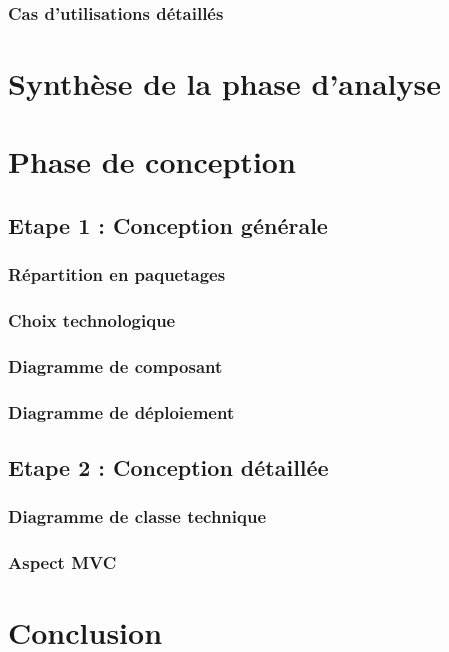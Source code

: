 \documentclass[a4paper,table]{article}
\begin{document}
\subsubsection{Cas d'utilisations détaillés}

\newpage

\section{Synthèse de la phase d'analyse}

\newpage

\section{Phase de conception}

\subsection{Etape 1 : Conception générale}

\subsubsection{Répartition en paquetages}

\subsubsection{Choix technologique}

\subsubsection{Diagramme de composant}

\subsubsection{Diagramme de déploiement}

\subsection{Etape 2 : Conception détaillée}

\subsubsection{Diagramme de classe technique}

\subsubsection{Aspect MVC}

\newpage

\section*{Conclusion}
\end{document}
